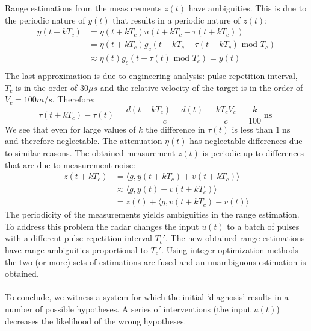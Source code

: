 \documentclass[oneside,12pt]{article}
\begin{document}
%
Range estimations from the measurements $z(t)$ have ambiguities. This is due to the periodic nature of $y(t)$ that results in a periodic nature of $z(t)$:
%
\begin{equation}\label{eq:range_amb}
    \begin{split}
        y(t + kT_c) &= \eta(t + kT_c) u(t + kT_c - \tau(t + kT_c))\\
        &= \eta(t + kT_c) g_{c}(t + kT_c - \tau(t + kT_c) \text{ mod } T_c)\\
        &\approx \eta(t) g_{c}(t - \tau(t) \text{ mod } T_c) = y(t)\\
    \end{split}
\end{equation}
%
The last approximation is due to engineering analysis: pulse repetition interval, $T_c$ is in the order of $30\mu s$ and the relative velocity of the target is in the order of $V_c=100 m/s$. Therefore:
%
\begin{equation}
    \tau(t+kT_c) - \tau(t)=\frac{d(t+kT_c)-d(t)}{c}=\frac{kT_c V_c}{c}=\frac{k}{100}\operatorname{ns}    
\end{equation}
%
We see that even for large values of $k$ the difference in $\tau(t)$ is less than $1 \operatorname{ns}$ and therefore neglectable. The attenuation $\eta(t)$ has neglectable differences due to similar reasons. The obtained measurement $z(t)$ is periodic up to differences that are due to measurement noise:
%
\begin{equation}\label{eq:range_amb}
    \begin{split}
        z(t + kT_c) &= \langle g, y(t + kT_c) + v(t + kT_c) \rangle\\
        &\approx \langle g, y(t) + v(t + kT_c) \rangle\\
        &= z(t) + \langle g, v(t + kT_c) - v(t) \rangle
    \end{split}
\end{equation}
%
The periodicity of the measurements yields ambiguities in the range estimation. To address this problem the radar changes the input $u(t)$ to a batch of pulses with a different pulse repetition interval $T_c'$. The new obtained range estimations have range ambiguities proportional to $T_c'$. Using integer optimization methods the two (or more) sets of estimations are fused and an unambiguous estimation is obtained.\\\\
%
To conclude, we witness a system for which the initial `diagnosis' results in a number of possible  hypotheses. A series of interventions (the input $u(t)$) decreases the likelihood of the wrong  hypotheses.\\\\
\end{document}
